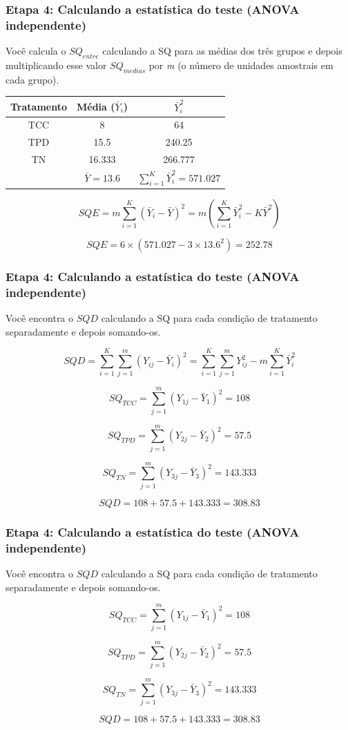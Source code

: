 \documentclass[11pt]{beamer}
\begin{document}
\begin{frame}
\frametitle{Etapa 4: Calculando a estatística do teste (ANOVA independente)}
Você calcula o $SQ_{entre}$ calculando a SQ para as médias dos três grupos e depois multiplicando esse valor $SQ_{medias}$ por \textit{m} (o número de unidades amostrais em cada grupo).

\begin{center}
\begin{tabular}{ccc} 
 \hline
Tratamento & Média ($\bar{Y}_i$) & $\bar{Y}_i^2$\\
 \hline
TCC & 8 & 64 \\
TPD & 15.5 & 240.25 \\
TN  & 16.333 & 266.777 \\
 \hline
 & $\bar{Y}=13.6$ & $\sum_{i=1}^K\bar{Y}_i^2 = 571.027$\\
 \hline
\end{tabular}
\end{center}   
 
\[SQE = m \sum_{i=1}^K(\bar{Y}_i-\bar{Y})^2 = m(\sum_{i=1}^K\bar{Y}_i^2-K\bar{Y}^2)\]

\[SQE =  6 \times (571.027- 3\times 13.6^2) = 252.78\]

\end{frame}

\begin{frame}
\frametitle{Etapa 4: Calculando a estatística do teste (ANOVA independente)}
Você encontra o $SQD$ calculando a SQ para cada condição de tratamento separadamente e depois somando-os.

\[SQD = \sum_{i=1}^K\sum_{j=1}^m (Y_{ij}-\bar{Y}_i)^2 = \sum_{i=1}^K\sum_{j=1}^m Y_{ij}^2 -m\sum_{i=1}^K\bar{Y}_i^2\]

\[SQ_{TCC} = \sum_{j=1}^m (Y_{1j}-\bar{Y}_1)^2 = 108\]

\[SQ_{TPD} = \sum_{j=1}^m (Y_{2j}-\bar{Y}_2)^2 = 57.5\]

\[SQ_{TN} = \sum_{j=1}^m (Y_{3j}-\bar{Y}_3)^2 = 143.333\]

\[SQD = 108+57.5+143.333=308.83\]
\end{frame}

\begin{frame}
\frametitle{Etapa 4: Calculando a estatística do teste (ANOVA independente)}
Você encontra o $SQD$ calculando a SQ para cada condição de tratamento separadamente e depois somando-os.

\[SQ_{TCC} = \sum_{j=1}^m (Y_{1j}-\bar{Y}_1)^2 = 108\]

\[SQ_{TPD} = \sum_{j=1}^m (Y_{2j}-\bar{Y}_2)^2 = 57.5\]

\[SQ_{TN} = \sum_{j=1}^m (Y_{3j}-\bar{Y}_3)^2 = 143.333\]

\[SQD = 108+57.5+143.333=308.83\]
\end{frame}
\end{document}
